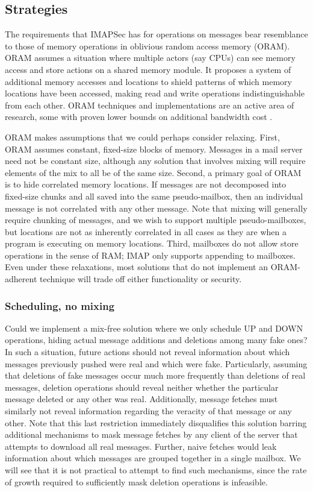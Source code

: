 \documentclass[pageno]{jpaper}
\newcommand{\project}{IMAPSec }
\begin{document}
\label{best-metadata}
\subsection{Strategies}

The requirements that \project has for operations on messages bear resemblance to those of memory operations in oblivious random access memory (ORAM)\cite{oram}. ORAM assumes a situation where multiple actors (say CPUs) can see memory access and store actions on a shared memory module. It proposes a system of additional memory accesses and locations to shield patterns of which memory locations have been accessed, making read and write operations indistinguishable from each other. ORAM techniques and implementations are an active area of research, some with proven lower bounds on additional bandwidth cost \cite{stefanov2013path}.

ORAM makes assumptions that we could perhaps consider relaxing. First, ORAM assumes constant, fixed-size blocks of memory. Messages in a mail server need not be constant size, although any solution that involves mixing will require elements of the mix to all be of the same size. Second, a primary goal of ORAM is to hide correlated memory locations. If messages are not decomposed into fixed-size chunks and all saved into the same pseudo-mailbox, then an individual message is not correlated with any other message. Note that mixing will generally require chunking of messages, and we wish to support multiple pseudo-mailboxes, but locations are not as inherently correlated in all cases as they are when a program is executing on memory locations. Third, mailboxes do not allow store operations in the sense of RAM; IMAP only supports appending to mailboxes. Even under these relaxations, most solutions that do not implement an ORAM-adherent technique will trade off either functionality or security.


\subsubsection{Scheduling, no mixing}
Could we implement a mix-free solution where we only schedule UP and DOWN operations, hiding actual message additions and deletions among many fake ones? In such a situation, future actions should not reveal information about which messages previously pushed were real and which were fake. Particularly, assuming that deletions of fake messages occur much more frequently than deletions of real messages, deletion operations should reveal neither whether the particular message deleted or any other was real. Additionally, message fetches must similarly not reveal information regarding the veracity of that message or any other. Note that this last restriction immediately disqualifies this solution barring additional mechanisms to mask message fetches by any client of the server that attempts to download all real messages. Further, naive fetches would leak information about which messages are grouped together in a single mailbox. We will see that it is not practical to attempt to find such mechanisms, since the rate of growth required to sufficiently mask deletion operations is infeasible.
\end{document}
